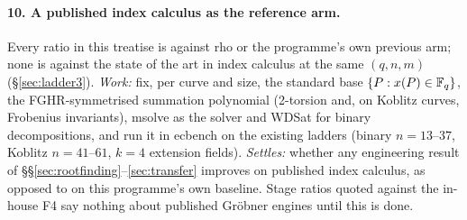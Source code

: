 \paragraph{10. A published index calculus as the reference arm.} Every
ratio in this treatise is against rho or the programme's own previous arm;
none is against the state of the art in index calculus at the same
$(q,n,m)$ (\S\ref{sec:ladder3}). \emph{Work:} fix, per curve and size, the
standard base $\{P:x(P)\in\mathbb{F}_q\}$, the FGHR-symmetrised summation
polynomial (2-torsion and, on Koblitz curves, Frobenius invariants), msolve
as the solver and WDSat for binary decompositions, and run it in ecbench
on the existing ladders (binary $n=13$--$37$, Koblitz $n=41$--$61$, $k=4$
extension fields). \emph{Settles:} whether any engineering result of
\S\S\ref{sec:rootfinding}--\ref{sec:transfer} improves on published index
calculus, as opposed to on this programme's own baseline. Stage ratios
quoted against the in-house F4 say nothing about published Gr\"obner
engines until this is done.

